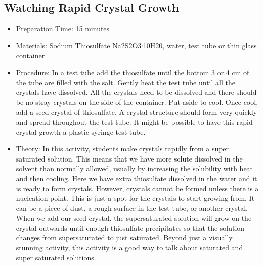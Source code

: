 \subsection{Watching Rapid Crystal Growth}
\begin{itemize}
\item{Preparation Time: 15 minutes}
\item{Materials: Sodium Thiosulfate Na2S2O3∙10H20, water, test tube or thin glass container}
\item{Procedure: In a test tube add the thiosulfate until the bottom 3 or 4 cm of the tube are filled with the salt. Gently heat the test tube until all the crystals have dissolved. All the crystals need to be dissolved and there should be no stray crystals on the side of the container. Put aside to cool. Once cool, add a seed crystal of thiosulfate. A crystal structure should form very quickly and spread throughout the test tube. It might be possible to have this rapid crystal growth a plastic syringe test tube.}
\item{Theory: In this activity, students make crystals rapidly from a super saturated solution. This means that we have more solute dissolved in the solvent than normally allowed, usually by increasing the solubility with heat and then cooling. Here we have extra thiosulfate dissolved in the water and it is ready to form crystals. However, crystals cannot be formed unless there is a nucleation point. This is just a spot for the crystals to start growing from. It can be a piece of dust, a rough surface in the test tube, or another crystal. When we add our seed crystal, the supersaturated solution will grow on the crystal outwards until enough thiosulfate precipitates so that the solution changes from supersaturated to just saturated. Beyond just a visually stunning activity, this activity is a good way to talk about saturated and super saturated solutions. }
\end{itemize}

